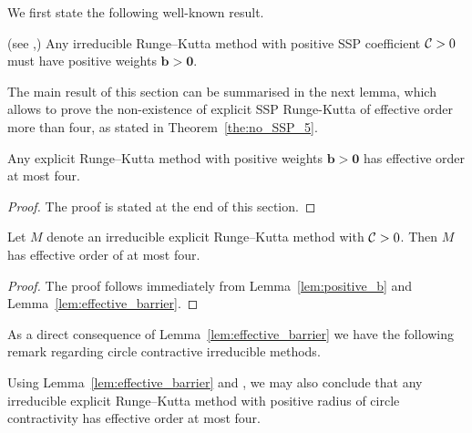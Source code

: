 %
We first state the following well-known result.
\begin{lemma}\label{lem:positive_b}(see \cite[Theorem~4.2]{Kraaijevanger1991},\cite[Lemma 4.2]{Ruuth2002})
	Any irreducible Runge--Kutta method with positive SSP coefficient $\mathcal{C}>0$
	must have positive weights $\bm{b} > \bm{0}$.
\end{lemma}

The main result of this section can be summarised in the next lemma, which allows 
to prove the non-existence of explicit SSP Runge-Kutta of effective order more than four,
 as stated in Theorem~\ref{the:no_SSP_5}. 
\begin{lemma}\label{lem:effective_barrier}
	Any explicit Runge--Kutta method with positive weights $\bm{b} > \bm{0}$ 
	has effective order at most four.
\end{lemma}
\begin{proof}
	The proof is stated at the end of this section.
\end{proof}

\begin{theorem}\label{the:no_SSP_5}
    Let $M$ denote an irreducible explicit Runge--Kutta method with $\mathcal{C}>0$.
    Then $M$ has effective order of at most four.
\end{theorem}
\begin{proof}
	The proof follows immediately from Lemma~\ref{lem:positive_b} and 
	Lemma~\ref{lem:effective_barrier}.
\end{proof}

As a direct consequence of Lemma~\ref{lem:effective_barrier} we have the following 
remark regarding circle contractive irreducible methods.
\begin{remark}
	Using Lemma~\ref{lem:effective_barrier} and \cite[Theorem~4.1]{dahlquist2006}, 
  	we may also conclude that any irreducible explicit Runge--Kutta method with positive radius of
  	circle contractivity has effective order at most four.
\end{remark}

